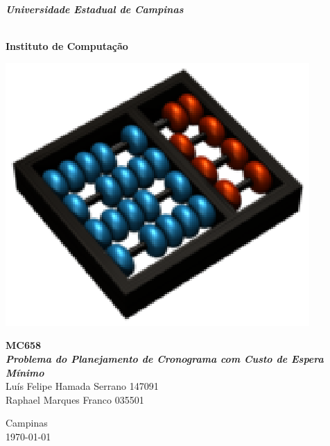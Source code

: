 \begin{titlepage}
\begin{center}
\Large{\textbf{\textit{Universidade Estadual de Campinas}}} \\\vspace{.5cm}
\hspace{0.1cm}\LogoUnicamp \\\vspace{.7cm}

\textbf{\textit\LARGE{Instituto de Computação}}\\\vspace{.5cm}
\Large{
\includegraphics[scale =0.4]{eps/logo-ic-unicamp-slant-tint-blk-sky-ora-0160.eps}\\\vspace{2cm}
\Large{
	\textbf{\LARGE{MC658}\\\vspace{0.5cm}
	\textit{Problema do Planejamento de Cronograma com Custo de Espera Mínimo}\\\vspace{3cm}
}
\centering
\textnormal{Luís Felipe Hamada Serrano 147091\\Raphael Marques Franco 035501}\\\vspace{4cm}

Campinas\\\today{}}
}
\end{center}
\end{titlepage}
